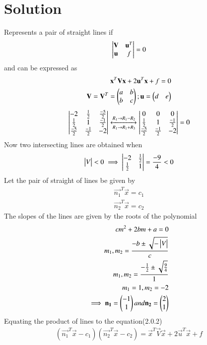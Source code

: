 \documentclass[journal,12pt,twocolumn]{IEEEtran}
\begin{document}
\section{Solution}
Represents a pair of straight lines if
\begin{align}
\begin{vmatrix}
\mathbf{V}&\mathbf{u}^T\\
\mathbf{u}&f\end{vmatrix} = 0
\end{align}
and can be expressed as
\begin{align}
\mathbf{x}^T\mathbf{V}\mathbf{x}+2\mathbf{u}^T\mathbf{x}+f=0 \\
\mathbf{V}=\mathbf{V}^T=\begin{pmatrix}a & b \\ b & c\end{pmatrix} ;
\mathbf{u}=\begin{pmatrix}d & e\end{pmatrix}
\end{align}
\begin{align}
\begin{vmatrix}
-2&\frac{1}{2}&\frac{-5}{2}\\
\frac{1}{2}&1&\frac{-1}{2}\\
\frac{-5}{2}&\frac{-1}{2}&-2\end{vmatrix}
\xleftrightarrow[R_1\rightarrow R_1+R_3]{R_1\rightarrow R_1-R_2}
\begin{vmatrix}
0&0&0\\
\frac{1}{2}&1&\frac{-1}{2}\\
\frac{-5}{2}&\frac{-1}{2}&-2\end{vmatrix}=0
\end{align}
Now two intersecting lines are obtained when
\begin{align}
\begin{vmatrix}V\end{vmatrix} < 0 
\implies \begin{vmatrix}-2&\frac{1}{2}\\\frac{1}{2}&1\end{vmatrix}
=\frac{-9}{4} < 0
\end{align}
Let the pair of straight of lines be given by
\begin{align}
\vec{n_1}^T\vec{x}=c_1\\
\vec{n_2}^T\vec{x}=c_2
\end{align}
The slopes of the lines are given by the roots of the polynomial 
\begin{align}
cm^2+2bm+a=0 \\
m_1,m_2 = \frac{-b\pm\sqrt{-\begin{vmatrix}V\end{vmatrix}}}{c}\\
m_1,m_2 = \frac{-\frac{1}{2}\pm\sqrt{\frac{9}{4}}}{1}\\
m_1= 1 , m_2 =-2\\
\implies\mathbf{n_1}=\begin{pmatrix}-1\\1\end{pmatrix} and \mathbf{n_2}=\begin{pmatrix}2\\1\end{pmatrix}
\end{align}
Equating the product of lines to the equation(2.0.2)
\begin{align}
(\vec{n_1}^T\vec{x}-c_1)(\vec{n_2}^T\vec{x}-c_2) =
\vec{x}^T\vec{V}\vec{x}+2\vec{u}^T\vec{x}+f 
\end{align}
\end{document}
